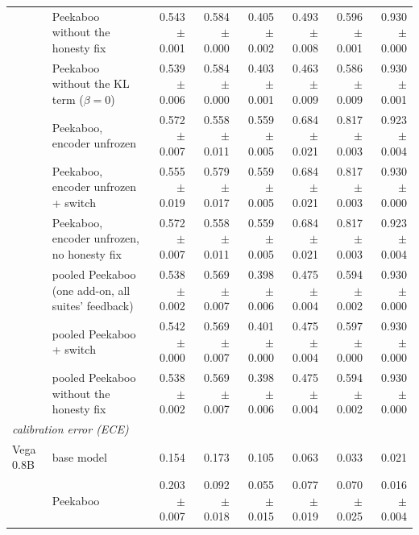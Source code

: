 \begin{table}[tbp]
{\begin{tabular}{llrrrrrr}
 & Peekaboo without the honesty fix & 0.543 {\scriptsize$\pm$0.001} & 0.584 {\scriptsize$\pm$0.000} & 0.405 {\scriptsize$\pm$0.002} & 0.493 {\scriptsize$\pm$0.008} & 0.596 {\scriptsize$\pm$0.001} & 0.930 {\scriptsize$\pm$0.000} \\
 & Peekaboo without the KL term ($\beta = 0$) & 0.539 {\scriptsize$\pm$0.006} & 0.584 {\scriptsize$\pm$0.000} & 0.403 {\scriptsize$\pm$0.001} & 0.463 {\scriptsize$\pm$0.009} & 0.586 {\scriptsize$\pm$0.009} & 0.930 {\scriptsize$\pm$0.001} \\
 & Peekaboo, encoder unfrozen & 0.572 {\scriptsize$\pm$0.007} & 0.558 {\scriptsize$\pm$0.011} & 0.559 {\scriptsize$\pm$0.005} & 0.684 {\scriptsize$\pm$0.021} & 0.817 {\scriptsize$\pm$0.003} & 0.923 {\scriptsize$\pm$0.004} \\
 & Peekaboo, encoder unfrozen + switch & 0.555 {\scriptsize$\pm$0.019} & 0.579 {\scriptsize$\pm$0.017} & 0.559 {\scriptsize$\pm$0.005} & 0.684 {\scriptsize$\pm$0.021} & 0.817 {\scriptsize$\pm$0.003} & 0.930 {\scriptsize$\pm$0.000} \\
 & Peekaboo, encoder unfrozen, no honesty fix & 0.572 {\scriptsize$\pm$0.007} & 0.558 {\scriptsize$\pm$0.011} & 0.559 {\scriptsize$\pm$0.005} & 0.684 {\scriptsize$\pm$0.021} & 0.817 {\scriptsize$\pm$0.003} & 0.923 {\scriptsize$\pm$0.004} \\
 & pooled Peekaboo (one add-on, all suites' feedback) & 0.538 {\scriptsize$\pm$0.002} & 0.569 {\scriptsize$\pm$0.007} & 0.398 {\scriptsize$\pm$0.006} & 0.475 {\scriptsize$\pm$0.004} & 0.594 {\scriptsize$\pm$0.002} & 0.930 {\scriptsize$\pm$0.000} \\
 & pooled Peekaboo + switch & 0.542 {\scriptsize$\pm$0.000} & 0.569 {\scriptsize$\pm$0.007} & 0.401 {\scriptsize$\pm$0.000} & 0.475 {\scriptsize$\pm$0.004} & 0.597 {\scriptsize$\pm$0.000} & 0.930 {\scriptsize$\pm$0.000} \\
 & pooled Peekaboo without the honesty fix & 0.538 {\scriptsize$\pm$0.002} & 0.569 {\scriptsize$\pm$0.007} & 0.398 {\scriptsize$\pm$0.006} & 0.475 {\scriptsize$\pm$0.004} & 0.594 {\scriptsize$\pm$0.002} & 0.930 {\scriptsize$\pm$0.000} \\
\midrule
\multicolumn{8}{l}{\textit{calibration error (ECE)}} \\
\midrule
Vega 0.8B & base model & 0.154 & 0.173 & 0.105 & 0.063 & 0.033 & 0.021 \\
 & Peekaboo & 0.203 {\scriptsize$\pm$0.007} & 0.092 {\scriptsize$\pm$0.018} & 0.055 {\scriptsize$\pm$0.015} & 0.077 {\scriptsize$\pm$0.019} & 0.070 {\scriptsize$\pm$0.025} & 0.016 {\scriptsize$\pm$0.004} \\

\end{tabular}}
\end{table}
